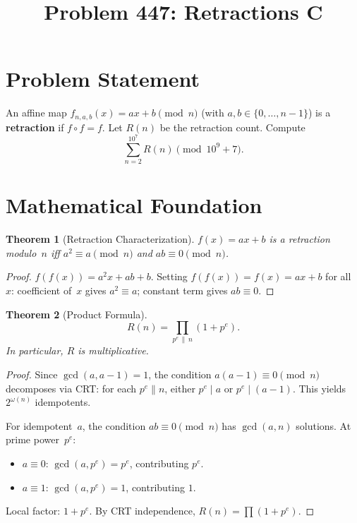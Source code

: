 \documentclass[12pt]{article}
\title{Problem 447: Retractions C}
\author{}
\date{}
\newtheorem{theorem}{Theorem}
\begin{document}
\maketitle

\section{Problem Statement}
An affine map $f_{n,a,b}(x) = ax + b \pmod{n}$ (with $a, b \in \{0, \ldots, n-1\}$) is a \textbf{retraction} if $f \circ f = f$. Let $R(n)$ be the retraction count. Compute
\[
\sum_{n=2}^{10^7} R(n) \pmod{10^9 + 7}.
\]

\section{Mathematical Foundation}

\begin{theorem}[Retraction Characterization]
$f(x) = ax + b$ is a retraction modulo~$n$ iff $a^2 \equiv a \pmod{n}$ and $ab \equiv 0 \pmod{n}$.
\end{theorem}

\begin{proof}
$f(f(x)) = a^2 x + ab + b$. Setting $f(f(x)) = f(x) = ax + b$ for all~$x$: coefficient of~$x$ gives $a^2 \equiv a$; constant term gives $ab \equiv 0$.
\end{proof}

\begin{theorem}[Product Formula]
\label{thm:product}
\[
R(n) = \prod_{p^e \,\|\, n} (1 + p^e).
\]
In particular, $R$ is multiplicative.
\end{theorem}

\begin{proof}
Since $\gcd(a, a-1) = 1$, the condition $a(a-1) \equiv 0 \pmod{n}$ decomposes via CRT: for each $p^e \| n$, either $p^e \mid a$ or $p^e \mid (a-1)$. This yields $2^{\omega(n)}$ idempotents.

For idempotent~$a$, the condition $ab \equiv 0 \pmod{n}$ has $\gcd(a,n)$ solutions. At prime power~$p^e$:
\begin{itemize}
\item $a \equiv 0$: $\gcd(a, p^e) = p^e$, contributing $p^e$.
\item $a \equiv 1$: $\gcd(a, p^e) = 1$, contributing $1$.
\end{itemize}
Local factor: $1 + p^e$. By CRT independence, $R(n) = \prod(1 + p^e)$.
\end{proof}
\end{document}
